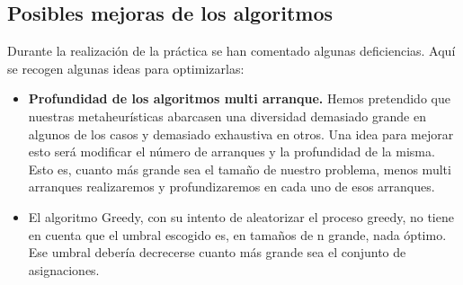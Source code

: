 \subsection{Posibles mejoras de los algoritmos}

Durante la realización de la práctica se han comentado algunas deficiencias. Aquí se recogen algunas ideas para optimizarlas:

\begin{itemize}
	\item \textbf{Profundidad de los algoritmos multi arranque.} Hemos pretendido que nuestras metaheurísticas abarcasen una diversidad demasiado grande en algunos de los casos y demasiado exhaustiva en otros. Una idea para mejorar esto será modificar el número de arranques y la profundidad de la misma. Esto es, cuanto más grande sea el tamaño de nuestro problema, menos multi arranques realizaremos y profundizaremos en cada uno de esos arranques.
	
	\item El algoritmo Greedy, con su intento de aleatorizar el proceso greedy, no tiene en cuenta que el umbral escogido es, en tamaños de n grande, nada óptimo. Ese umbral debería decrecerse cuanto más grande sea el conjunto de asignaciones.
	
\end{itemize}







